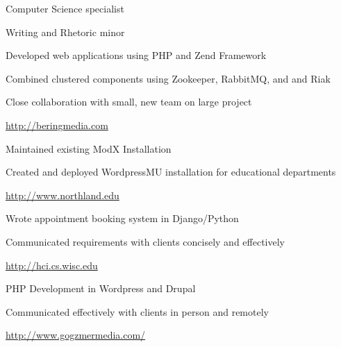 \documentclass[letterpaper,11pt,notitlepage]{article}
\begin{document}

\vbar
{}
    \begin{employment}
        \item Computer Science specialist
        \item Writing and Rhetoric minor
    \end{employment}
\vbar
{}
        \begin{employment}
            \item Developed web applications using PHP and Zend Framework
            \item Combined clustered components using Zookeeper, RabbitMQ,
            and and Riak
            \item Close collaboration with small, new team on large project
            \item \url{http://beringmedia.com}
        \end{employment}
        \begin{employment}
            \item Maintained existing ModX Installation
            \item Created and deployed WordpressMU installation for educational departments 
            \item \url{http://www.northland.edu}
        \end{employment}
        \begin{employment}
            \item Wrote appointment booking system in Django/Python 
            \item Communicated requirements with clients concisely and effectively
            \item \url{http://hci.cs.wisc.edu}
        \end{employment}
        \begin{employment}
            \item PHP Development in Wordpress and Drupal
            \item Communicated effectively with clients in person and remotely
            \item \url{http://www.gogzmermedia.com/}
        \end{employment}
\end{document}
